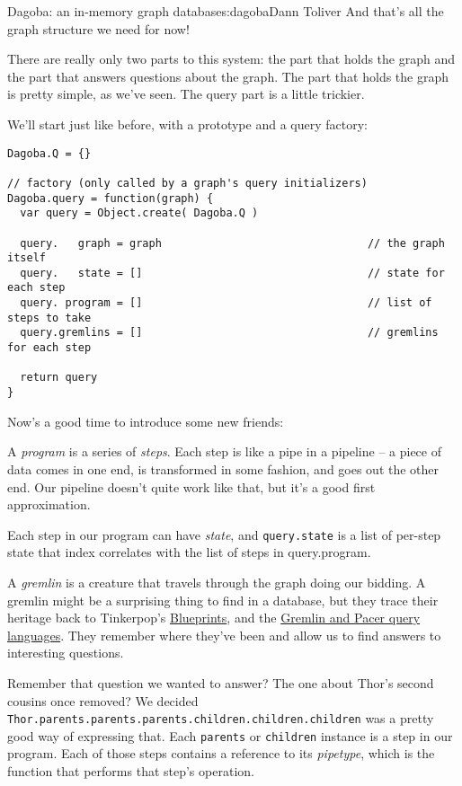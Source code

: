 \begin{aosachapter}{Dagoba: an in-memory graph database}{s:dagoba}{Dann Toliver}
And that's all the graph structure we need for now!

\label{enter-the-query}

There are really only two parts to this system: the part that holds the
graph and the part that answers questions about the graph. The part that
holds the graph is pretty simple, as we've seen. The query part is a
little trickier.

We'll start just like before, with a prototype and a query factory:

\begin{verbatim}
Dagoba.Q = {}

// factory (only called by a graph's query initializers)
Dagoba.query = function(graph) {
  var query = Object.create( Dagoba.Q )
  
  query.   graph = graph                                // the graph itself
  query.   state = []                                   // state for each step
  query. program = []                                   // list of steps to take  
  query.gremlins = []                                   // gremlins for each step

  return query
}
\end{verbatim}

Now's a good time to introduce some new friends:

A \emph{program} is a series of \emph{steps}. Each step is like a pipe
in a pipeline -- a piece of data comes in one end, is transformed in
some fashion, and goes out the other end. Our pipeline doesn't quite
work like that, but it's a good first approximation.

Each step in our program can have \emph{state}, and \texttt{query.state}
is a list of per-step state that index correlates with the list of steps
in query.program.

A \emph{gremlin} is a creature that travels through the graph doing our
bidding. A gremlin might be a surprising thing to find in a database,
but they trace their heritage back to Tinkerpop's
\href{http://euranova.eu/upl_docs/publications/an-empirical-comparison-of-graph-databases.pdf}{Blueprints},
and the
\href{http://edbt.org/Proceedings/2013-Genova/papers/workshops/a29-holzschuher.pdf}{Gremlin
and Pacer query languages}. They remember where they've been and allow
us to find answers to interesting questions.

Remember that question we wanted to answer? The one about Thor's second
cousins once removed? We decided
\texttt{Thor.parents.parents.parents.children.children.children} was a
pretty good way of expressing that. Each \texttt{parents} or
\texttt{children} instance is a step in our program. Each of those steps
contains a reference to its \emph{pipetype}, which is the function that
performs that step's operation.


\end{aosachapter}
